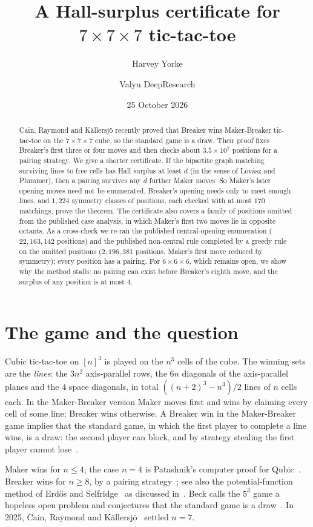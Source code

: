\documentclass[11pt]{amsart}
\title{A Hall-surplus certificate for \texorpdfstring{$7\times7\times7$}{7x7x7} tic-tac-toe}
\author{Harvey Yorke}
\author{Valyu DeepResearch}
\date{25 October 2026}
\theoremstyle{definition}
\theoremstyle{remark}
\begin{document}
\raggedbottom
\begin{abstract}
Cain, Raymond and K\"allersj\"o recently proved that Breaker wins Maker-Breaker tic-tac-toe on the $7\times7\times7$ cube, so the standard game is a draw. Their proof fixes Breaker's first three or four moves and then checks about $3.5\times10^7$ positions for a pairing strategy. We give a shorter certificate. If the bipartite graph matching surviving lines to free cells has Hall surplus at least $d$ (in the sense of Lov\'asz and Plummer), then a pairing survives any $d$ further Maker moves. So Maker's later opening moves need not be enumerated. Breaker's opening needs only to meet enough lines, and $1{,}224$ symmetry classes of positions, each checked with at most $170$ matchings, prove the theorem. The certificate also covers a family of positions omitted from the published case analysis, in which Maker's first two moves lie in opposite octants. As a cross-check we re-ran the published central-opening enumeration ($22{,}163{,}142$ positions) and the published non-central rule completed by a greedy rule on the omitted positions ($2{,}196{,}381$ positions, Maker's first move reduced by symmetry); every position has a pairing. For $6\times6\times6$, which remains open, we show why the method stalls: no pairing can exist before Breaker's eighth move, and the surplus of any position is at most $4$.
\end{abstract}
\maketitle

\section{The game and the question}

Cubic tic-tac-toe on $[n]^3$ is played on the $n^3$ cells of the cube. The winning sets are the \emph{lines}: the $3n^2$ axis-parallel rows, the $6n$ diagonals of the axis-parallel planes and the $4$ space diagonals, in total $((n+2)^3-n^3)/2$ lines of $n$ cells each. In the Maker-Breaker version Maker moves first and wins by claiming every cell of some line; Breaker wins otherwise. A Breaker win in the Maker-Breaker game implies that the standard game, in which the first player to complete a line wins, is a draw: the second player can block, and by strategy stealing the first player cannot lose~\cite[Sec.~2]{CRK2025}.

Maker wins for $n\le 4$; the case $n=4$ is Patashnik's computer proof for Qubic~\cite{Patashnik1980}. Breaker wins for $n\ge 8$, by a pairing strategy~\cite{GolombHales2002}; see also the potential-function method of Erd\H{o}s and Selfridge~\cite{ErdosSelfridge1973} as discussed in~\cite{CRK2025}. Beck calls the $5^3$ game a hopeless open problem and conjectures that the standard game is a draw~\cite{Beck2008}. In 2025, Cain, Raymond and K\"allersj\"o~\cite{CRK2025} settled $n=7$.
\end{document}
